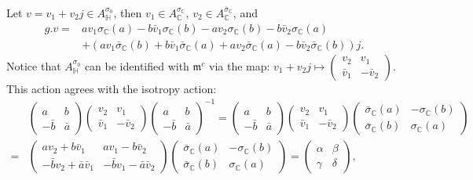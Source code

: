 \documentclass[oneside,11pt]{amsart}
\theoremstyle{definition}
\theoremstyle{remark}
\numberwithin{thm}{section}
\numberwithin{equation}{section}
\begin{document}
Let $v=v_1+v_2j\in A_\mathbb H^{\sigma_0}$, then $v_1\in A^{\sigma_\mathbb C}_\mathbb C$, $v_2\in A^{\bar \sigma_\mathbb C}_\mathbb C$, and
\begin{align*}
g.v
=&av_1\sigma_{\mathbb C}(a)-b\bar v_1\sigma_{\mathbb C}(b)-av_2\sigma_{\mathbb C}(b) -b\bar v_2\sigma_{\mathbb C}(a)
\\
& +(av_1\bar\sigma_{\mathbb C}(b)+b\bar v_1\bar\sigma_{\mathbb C}(a)+av_2\bar\sigma_{\mathbb C}(a)-b\bar v_2\bar\sigma_{\mathbb C}(b))j.
\end{align*}
Notice that $A_\mathbb H^{\sigma_0}$ can be identified with $\mathfrak m^c$ via the map: $v_1+v_2j\mapsto \begin{pmatrix}
    v_2 & v_1 \\
    \bar v_1 & -\bar v_2
\end{pmatrix}$. This action agrees with the isotropy action:
\begin{align*}
& \begin{pmatrix}
    a & b \\
    -\bar b & \bar a
\end{pmatrix}\begin{pmatrix}
    v_2 & v_1 \\
    \bar v_1 & -\bar v_2
\end{pmatrix}\begin{pmatrix}
    a & b \\
    -\bar b & \bar a
\end{pmatrix}^{-1}=\begin{pmatrix}
    a & b \\
    -\bar b & \bar a
\end{pmatrix}\begin{pmatrix}
    v_2 & v_1 \\
    \bar v_1 & -\bar v_2
\end{pmatrix}\begin{pmatrix}
    \bar\sigma_{\mathbb C}(a) & -\sigma_{\mathbb C}(b) \\
    \bar\sigma_{\mathbb C}(b) & \sigma_{\mathbb C}(a)
\end{pmatrix}\\
= & \begin{pmatrix}
    av_2+b\bar v_1 & av_1-b\bar v_2 \\
    -\bar bv_2+\bar a\bar v_1 & -\bar bv_1-\bar a\bar v_2
\end{pmatrix}\begin{pmatrix}
    \bar \sigma_{\mathbb C}(a) & -\sigma_{\mathbb C}(b) \\
    \bar \sigma_{\mathbb C}(b) & \sigma_{\mathbb C}(a)
\end{pmatrix} = \begin{pmatrix}
    \alpha & \beta \\
    \gamma & \delta
\end{pmatrix},
\end{align*}
\end{document}
